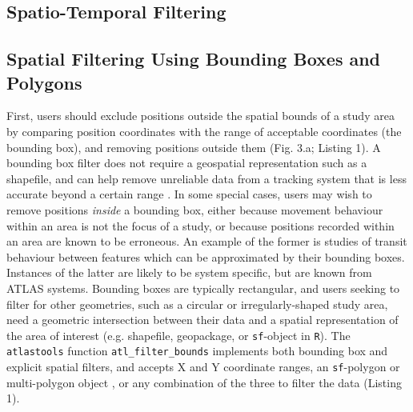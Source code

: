 \begin{refsection}
    \section*{Spatio-Temporal Filtering}

    \subsection*{Spatial Filtering Using Bounding Boxes and Polygons}

    First, users should exclude positions outside the spatial bounds of a study area by comparing position coordinates with the range of acceptable coordinates (the bounding box), and removing positions outside them (Fig. 3.a; Listing 1). 
    A bounding box filter does not require a geospatial representation such as a shapefile, and can help remove unreliable data from a tracking system that is less accurate beyond a certain range \citep[][]{beardsworth2021}.
    In some special cases, users may wish to remove positions \textit{inside} a bounding box, either because movement behaviour within an area is not the focus of a study, or because positions recorded within an area are known to be erroneous.
    An example of the former is studies of transit behaviour between features which can be approximated by their bounding boxes. 
    Instances of the latter are likely to be system specific, but are known from ATLAS systems. 
    Bounding boxes are typically rectangular, and users seeking to filter for other geometries, such as a circular or irregularly-shaped study area, need a geometric intersection between their data and a spatial representation of the area of interest (e.g. shapefile, geopackage, or \texttt{sf}-object in \texttt{R}).
    The \texttt{atlastools} function \texttt{atl\_filter\_bounds} implements both bounding box and explicit spatial filters, and accepts X and Y coordinate ranges, an \texttt{sf}-polygon or multi-polygon object \citep{pebesma2018}, or any combination of the three to filter the data (Listing 1).


\end{refsection}
